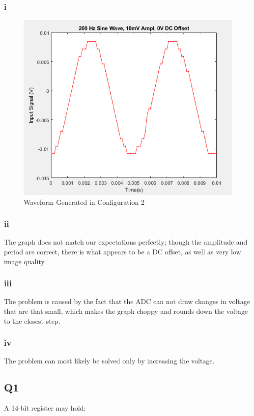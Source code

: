 \documentclass[
	letterpaper, %
	10pt, %
]{CSUniSchoolLabReport}
\begin{document}
  \subsubsection{i} \begin{figure}[h!]
    \centering
    \includegraphics[width=.9\textwidth]{Figures/L8Config2.png}
    \caption{Waveform Generated in Configuration 2}
    \label{fig:4}
  \end{figure}

  \subsubsection{ii} The graph does not match our expectations perfectly; though the amplitude and period are correct, there is what appears to be a DC offset, as well as very low image quality.

  \subsubsection{iii} The problem is caused by the fact that the ADC can not draw changes in voltage that are that small, which makes the graph choppy and rounds down the voltage to the closest step.

  \subsubsection{iv} The problem can most likely be solved only by increasing the voltage.

  \subsection{Q1} A 14-bit register may hold:
\end{document}
